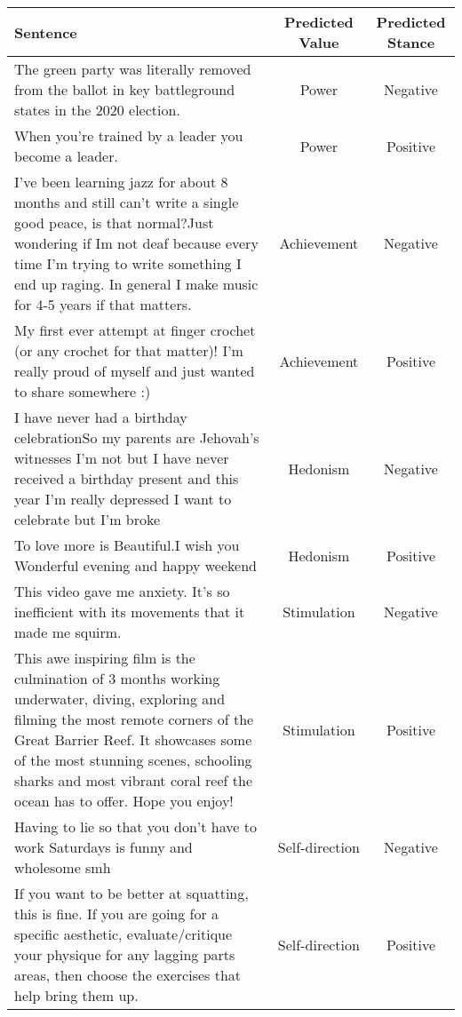 \begin{table*}

 \centering
 \resizebox{0.98\textwidth}{!}
 {%
 \fontsize{12}{12}\selectfont
 
 \begin{tabular}{p{12cm}cc}
 \toprule
 \textbf{Sentence}  & \textbf{Predicted Value} & \textbf{Predicted Stance} \\ 
 \midrule
The green party was literally removed from the ballot in key battleground states in the 2020 election. & Power & Negative \\
When you’re trained by a leader you become a leader. & Power & Positive \\
I've been learning jazz for about 8 months and still can't write a single good peace, is that normal?Just wondering if Im not deaf because every time I'm trying to write something I end up raging. In general I make music for 4-5 years if that matters. & Achievement & Negative \\
My first ever attempt at finger crochet (or any crochet for that matter)! I’m really proud of myself and just wanted to share somewhere :) & Achievement & Positive \\
I have never had a birthday celebrationSo my parents are Jehovah's witnesses I'm not but I have never received a birthday present and this year I'm really depressed I want to celebrate but I'm broke & Hedonism & Negative \\
To love more is Beautiful.I wish you Wonderful evening and happy weekend & Hedonism & Positive \\
This video gave me anxiety. It’s so inefficient with its movements that it made me squirm. & Stimulation & Negative \\
This awe inspiring film is the culmination of 3 months working underwater, diving, exploring and filming the most remote corners of the Great Barrier Reef. It showcases some of the most stunning scenes, schooling sharks and most vibrant coral reef the ocean has to offer. Hope you enjoy! & Stimulation & Positive \\
Having to lie so that you don't have to work Saturdays is funny and wholesome smh & Self-direction & Negative \\
If you want to be better at squatting, this is fine.  If you are going for a specific aesthetic, evaluate/critique your physique for any lagging parts areas, then choose the exercises that help bring them up. & Self-direction & Positive \\

\end{tabular}}
\end{table*}
